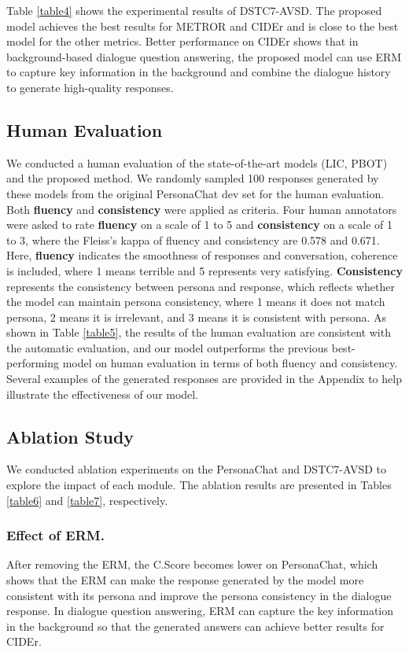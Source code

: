\documentclass[letterpaper]{article} \usepackage{aaai23}  \usepackage{times}  \usepackage{helvet}  \usepackage{courier}  \usepackage[hyphens]{url}  \usepackage{graphicx} \urlstyle{rm} \def\UrlFont{\rm}  \usepackage{natbib}  \usepackage{caption} \frenchspacing  \setlength{\pdfpagewidth}{8.5in}  \setlength{\pdfpageheight}{11in}  \usepackage{algorithm}
\begin{document}
Table \ref{table4} shows the experimental results of DSTC7-AVSD. The proposed model achieves the best results for METROR and CIDEr and is close to the best model for the other metrics. Better performance on CIDEr shows that in background-based dialogue question answering, the proposed model can use ERM to capture key information in the background and combine the dialogue history to generate high-quality responses. 

\subsection{Human Evaluation}
We conducted a human evaluation of the state-of-the-art models (LIC, PBOT) and the proposed method. We randomly sampled 100 responses generated by these models from the original PersonaChat dev set for the human evaluation. Both \textbf{fluency} and \textbf{consistency} were applied as criteria. Four human annotators were asked to rate \textbf{fluency} on a scale of 1 to 5 and \textbf{consistency} on a scale of 1 to 3, where the Fleiss’s kappa of fluency and consistency are 0.578 and 0.671. Here, \textbf{fluency} indicates the smoothness of responses and conversation, coherence is included, where 1 means terrible and 5 represents very satisfying. \textbf{Consistency} represents the consistency between persona and response, which reflects whether the model can maintain persona consistency, where 1 means it does not  match persona, 2 means it is irrelevant, and 3 means it is consistent with persona. As shown in Table \ref{table5}, the results of the human evaluation are consistent with the automatic evaluation, and our model outperforms the previous best-performing model on human evaluation in terms of both fluency and consistency. Several examples of the generated responses are provided in the Appendix to help illustrate the effectiveness of our model. 

\subsection{Ablation Study}
We conducted ablation experiments on the PersonaChat and DSTC7-AVSD to explore the impact of each module. The ablation results are presented in Tables \ref{table6} and \ref{table7}, respectively. 

\subsubsection{Effect of ERM.}
After removing the ERM, the C.Score becomes lower on PersonaChat, which shows that the ERM can make the response generated by the model more consistent with its persona and improve the persona consistency in the dialogue response. In dialogue question answering, ERM can capture the key information in the background so that the generated answers can achieve better results for CIDEr.
\end{document}
